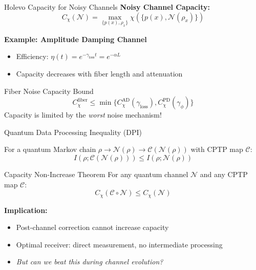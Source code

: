 \documentclass[aspectratio=169,12pt]{beamer}
\begin{document}
\begin{frame}{Holevo Capacity for Noisy Channels}
\textbf{Noisy Channel Capacity:}
$$C_\chi(\mathcal{N}) = \max_{\{p(x), \rho_x\}} \chi(\{p(x), \mathcal{N}(\rho_x)\})$$

\vspace{0.3cm}

\textbf{Example: Amplitude Damping Channel}
\begin{itemize}
\item Efficiency: $\eta(t) = e^{-\gamma_{\text{loss}} t} = e^{-\alpha L}$
\item Capacity decreases with fiber length and attenuation
\end{itemize}

\vspace{0.3cm}

\begin{block}{Fiber Noise Capacity Bound}
$$C_\chi^{\text{fiber}} \leq \min\{ C_\chi^{\text{AD}}(\gamma_{\text{loss}}), C_\chi^{\text{PD}}(\gamma_\phi) \}$$
Capacity is limited by the \textit{worst} noise mechanism!
\end{block}
\end{frame}

\begin{frame}{Quantum Data Processing Inequality (DPI)}
\begin{theorem}
For a quantum Markov chain $\rho \to \mathcal{N}(\rho) \to \mathcal{C}(\mathcal{N}(\rho))$ with CPTP map $\mathcal{C}$:
$$I(\rho; \mathcal{C}(\mathcal{N}(\rho))) \leq I(\rho; \mathcal{N}(\rho))$$
\end{theorem}

\vspace{0.3cm}

\begin{alertblock}{Capacity Non-Increase Theorem}
For any quantum channel $\mathcal{N}$ and any CPTP map $\mathcal{C}$:
$$C_\chi(\mathcal{C} \circ \mathcal{N}) \leq C_\chi(\mathcal{N})$$
\end{alertblock}

\vspace{0.3cm}

\textbf{Implication:}
\begin{itemize}
\item Post-channel correction cannot increase capacity
\item Optimal receiver: direct measurement, no intermediate processing
\item \textit{But can we beat this during channel evolution?}
\end{itemize}
\end{frame}
\end{document}
